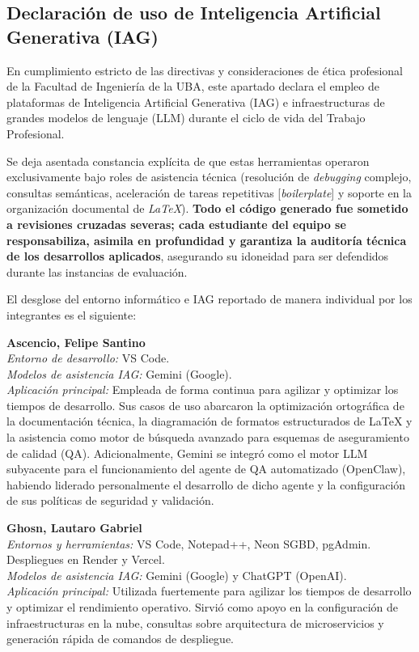 \newpage

\subsection{Declaración de uso de Inteligencia Artificial Generativa (IAG)}

En cumplimiento estricto de las directivas y consideraciones de ética profesional de la Facultad de Ingeniería de la UBA, este apartado declara el empleo de plataformas de Inteligencia Artificial Generativa (IAG) e infraestructuras de grandes modelos de lenguaje (LLM) durante el ciclo de vida del Trabajo Profesional.

Se deja asentada constancia explícita de que estas herramientas operaron exclusivamente bajo roles de asistencia técnica (resolución de \textit{debugging} complejo, consultas semánticas, aceleración de tareas repetitivas [\textit{boilerplate}] y soporte en la organización documental de \textit{LaTeX}). \textbf{Todo el código generado fue sometido a revisiones cruzadas severas; cada estudiante del equipo se responsabiliza, asimila en profundidad y garantiza la auditoría técnica de los desarrollos aplicados}, asegurando su idoneidad para ser defendidos durante las instancias de evaluación.

El desglose del entorno informático e IAG reportado de manera individual por los integrantes es el siguiente:

\vspace{0.3cm}

\noindent \textbf{Ascencio, Felipe Santino} \\
\textit{Entorno de desarrollo:} VS Code. \\
\textit{Modelos de asistencia IAG:} Gemini (Google). \\
\textit{Aplicación principal:} Empleada de forma continua para agilizar y optimizar los tiempos de desarrollo. Sus casos de uso abarcaron la optimización ortográfica de la documentación técnica, la diagramación de formatos estructurados de LaTeX y la asistencia como motor de búsqueda avanzado para esquemas de aseguramiento de calidad (QA). Adicionalmente, Gemini se integró como el motor LLM subyacente para el funcionamiento del agente de QA automatizado (OpenClaw), habiendo liderado personalmente el desarrollo de dicho agente y la configuración de sus políticas de seguridad y validación.

\vspace{0.3cm}

\noindent \textbf{Ghosn, Lautaro Gabriel} \\
\textit{Entornos y herramientas:} VS Code, Notepad++, Neon SGBD, pgAdmin. Despliegues en Render y Vercel. \\
\textit{Modelos de asistencia IAG:} Gemini (Google) y ChatGPT (OpenAI). \\
\textit{Aplicación principal:} Utilizada fuertemente para agilizar los tiempos de desarrollo y optimizar el rendimiento operativo. Sirvió como apoyo en la configuración de infraestructuras en la nube, consultas sobre arquitectura de microservicios y generación rápida de comandos de despliegue.

